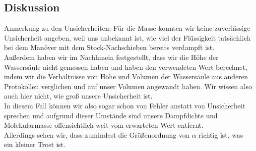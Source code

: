 \documentclass{article}
\begin{document}
\subsection{Diskussion}
Anmerkung zu den Unsicherheiten: Für die Masse konnten wir keine zuverlässige Unsicherheit angeben, weil uns unbekannt ist, wie viel der Flüssigkeit tatsächlich bei dem Manöver mit dem Stock-Nachschieben bereits verdampft ist. \\
Außerdem haben wir im Nachhinein festgestellt, dass wir die Höhe der Wassersäule nicht gemessen haben und haben den verwendeten Wert berechnet, indem wir die Verhältnisse von Höhe und Volumen der Wassersäule aus anderen Protokollen verglichen und auf unser Volumen angewandt haben. Wir wissen also auch hier nicht, wie groß unsere Unsicherheit ist.\\
In diesem Fall können wir also sogar schon von Fehler anstatt von Unsicherheit sprechen und aufgrund dieser Umstände sind unsere Dampfdichte und Molekularmasse offensichtlich weit vom erwarteten Wert entfernt.\\
Allerdings sehen wir, dass zumindest die Größenordnung von $\alpha$ richtig ist, was ein kleiner Trost ist.
\end{document}
